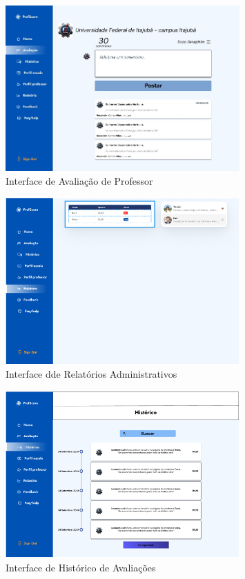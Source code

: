 \documentclass[12pt]{article}
\begin{document}
\begin{figure}[H] %
  \centering
  \includegraphics[width=0.8\textwidth]{interfaces/i5-avaliar-prof.png}
  \caption{Interface de Avaliação de Professor}
  \label{fig:i5-avaliar-prof}
\end{figure}

\begin{figure}[H] %
  \centering
  \includegraphics[width=0.8\textwidth]{interfaces/i6-relatorio.png}
  \caption{Interface dde Relatórios Administrativos}
  \label{fig:i6-relatorio}
\end{figure}

\begin{figure}[H] %
  \centering
  \includegraphics[width=0.8\textwidth]{interfaces/i7-historico.png}
  \caption{Interface de Histórico de Avaliações}
  \label{fig:i7-historico}
\end{figure}
\end{document}
